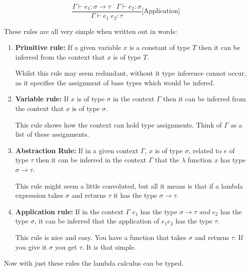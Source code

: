 \documentclass{l4proj}
\begin{document}
\begin{equation*} \label{eq:stlc-application}
    \frac{\Gamma \vdash e_1:\sigma\rightarrow\tau \;\;\; \Gamma \vdash e_2:\sigma}{\Gamma \vdash e_1 \; e_2:\tau} \text{[Application]}
\end{equation*}

These rules are all very simple when written out in words:

\begin{enumerate}
    \item \textbf{Primitive rule:} If a given variable $x$ is a constant of type $T$ then it can be inferred from the context that $x$ is of type $T$.
    
    Whilst this rule may seem redundant, without it type inference cannot occur, as it specifies the assignment of base types which would be infered.
    \item \textbf{Variable rule:} If $x$ is of type $\sigma$ in the context $\Gamma$ then it can be inferred from the context that $x$ is of type $\sigma$.
    
    This rule shows how the context can hold type assignments.
    Think of $\Gamma$ as a list of these assignments.
    \item \textbf{Abstraction Rule:} If in a given context $\Gamma$, $x$ is of type $\sigma$, related to $e$ of type $\tau$ then it can be inferred in the context $\Gamma$ that the $\lambda$ function $x$ has type $\sigma \rightarrow \tau$.
    
    This rule might seem a little convoluted, but all it means is that if a lambda expression takes $\sigma$ and returns $\tau$ it has the type $\sigma \rightarrow \tau$.

    \item \textbf{Application rule:} If in the context $\Gamma$ $e_1$ has the type $\sigma \rightarrow \tau$ \emph{and} $e_2$ has the type $\sigma$, it can be inferred that the application of $e_1 e_2$ has the type $\tau$.
    
    This rule is nice and easy.
    You have a function that takes $\sigma$ and returns $\tau$.
    If you give it $\sigma$ you get $\tau.$
    It is that simple.
\end{enumerate}

Now with just these rules the lambda calculus can be typed.
\end{document}
